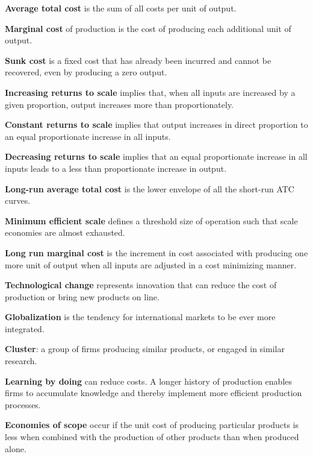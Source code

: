 \begin{keyterms}
\textbf{Average total cost} is the sum of all costs per unit of output.

\textbf{Marginal cost} of production is the cost of producing each additional unit of output.

\textbf{Sunk cost} is a fixed cost that has already been incurred and cannot be recovered, even by producing a zero output.

\textbf{Increasing returns to scale} implies that, when all inputs are increased by a given proportion, output increases more than proportionately.

\textbf{Constant returns to scale} implies that output increases in direct proportion to an equal proportionate increase in all inputs.

\textbf{Decreasing returns to scale} implies that an equal proportionate increase in all inputs leads to a less than proportionate increase in output.

\textbf{Long-run average total cost} is the lower envelope of all the short-run ATC curves.

\textbf{Minimum efficient scale} defines a threshold size of operation such that scale economies are almost exhausted.

\textbf{Long run marginal cost} is the increment in cost associated with producing one more unit of output when all inputs are adjusted in a cost minimizing manner.

\textbf{Technological change} represents innovation that can reduce the cost of production or bring new products on line.

\textbf{Globalization} is the tendency for international markets to be ever more integrated.

\textbf{Cluster}: a group of firms producing similar products, or engaged in similar research.

\textbf{Learning by doing} can reduce costs. A longer history of production enables firms to accumulate knowledge and thereby implement more efficient production processes.

\textbf{Economies of scope} occur if the unit cost of producing particular products is less when combined with the production of other products than when produced alone.
\end{keyterms}